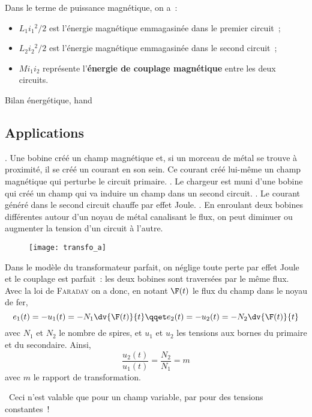 \documentclass[../main/main.tex]{subfiles}
\begin{document}
Dans le terme de puissance magnétique, on a~:
\begin{itemize}[label=$\diamond$, leftmargin=10pt]
	\item $L_1i_1{}^{2}/2$ est l'énergie magnétique emmagasinée dans le premier
	      circuit~;
	\item $L_2i_2{}^{2}/2$ est l'énergie magnétique emmagasinée dans le second
	      circuit~;
	\item $Mi_1i_2$ représente l'\textbf{énergie de couplage magnétique} entre les
	      deux circuits.
\end{itemize}
\begin{tror}{Bilan énergétique, hand}
	\vspace*{-10pt}
\end{tror}

\subsection{Applications}
\label{ssec:cplimpl}
\begin{itemize}[label=$\diamond$, leftmargin=10pt]
	. Une bobine
	créé un champ magnétique et, si un morceau de métal se trouve à proximité, il
	se créé un courant en son sein. Ce courant créé lui-même un champ magnétique
	qui perturbe le circuit primaire.
	. Le chargeur
	est muni d'une bobine qui créé un champ qui va induire un champ dans un second
	circuit.
	. Le courant généré dans le second circuit
	chauffe par effet Joule.
	. En enroulant deux bobines différentes
	autour d'un noyau de métal canalisant le flux, on peut diminuer ou augmenter
	la tension d'un circuit à l'autre.
\end{itemize}


\begin{figure}[h]
	\centering
	\texttt{[image: transfo\_a]}
	\label{fig:transfo}
\end{figure}
Dans le modèle du transformateur parfait, on néglige toute perte par effet Joule
et le couplage est parfait~: les deux bobines sont traversées par le même flux.
Avec la loi de \textsc{Faraday} on a donc, en notant $\F(t)$ le flux du champ
dans le noyau de fer,
\[
	e_1(t) = -u_1(t) = -N_1 \dv{\F(t)}{t}
	\qqet
	e_2(t) = -u_2(t) = -N_2 \dv{\F(t)}{t}
\]
avec $N_1$ et $N_2$ le nombre de spires, et $u_1$ et $u_2$ les tensions aux
bornes du primaire et du secondaire. Ainsi,
\[
	\boxed{\frac{u_2(t)}{u_1(t)} = \frac{N_2}{N_1} = m}
\]
avec $m$ le rapport de transformation.
\begin{center}
	\danger\ Ceci n'est valable que pour un champ variable, par pour des tensions
	constantes~! \danger\
\end{center}
\end{document}
